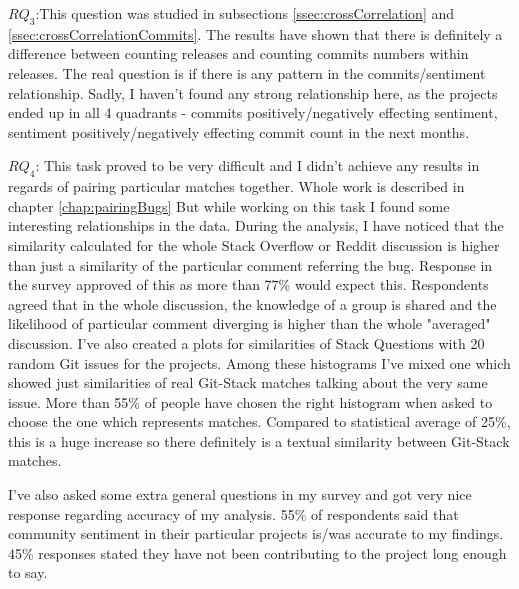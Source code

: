 \textbf{$RQ_{3}$}:This question was studied in subsections \ref{ssec:crossCorrelation} and \ref{ssec:crossCorrelationCommits}. The results have shown that there is definitely a difference between counting releases and counting commits numbers within releases. The real question is if there is any pattern in the commits/sentiment relationship. Sadly, I haven't found any strong relationship here, as the projects ended up in all 4 quadrants - commits positively/negatively effecting sentiment, sentiment positively/negatively effecting commit count in the next months. 

\textbf{$RQ_{4}$}: This task proved to be very difficult and I didn't achieve any results in regards of pairing particular matches together. Whole work is described in chapter \ref{chap:pairingBugs} But while working on this task I found some interesting relationships in the data. During the analysis, I have noticed that the similarity calculated for the whole Stack Overflow or Reddit discussion is higher than just a similarity of the particular comment referring the bug. Response in the survey approved of this as more than 77\% would expect this. Respondents agreed that in the whole discussion, the knowledge of a group is shared and the likelihood of particular comment diverging is higher than the whole "averaged" discussion. I've also created a plots for similarities of Stack Questions with 20 random Git issues for the projects. Among these histograms I've mixed one which showed just similarities of real Git-Stack matches talking about the very same issue. More than 55\% of people have chosen the right histogram when asked to choose the one which represents matches. Compared to statistical average of 25\%, this is a huge increase so there definitely is a textual similarity between Git-Stack matches.


I've also asked some extra general questions in my survey and got very nice response regarding accuracy of my analysis. 55\% of respondents said that community sentiment in their particular projects is/was accurate to my findings. 45\% responses stated they have not been contributing to the project long enough to say.